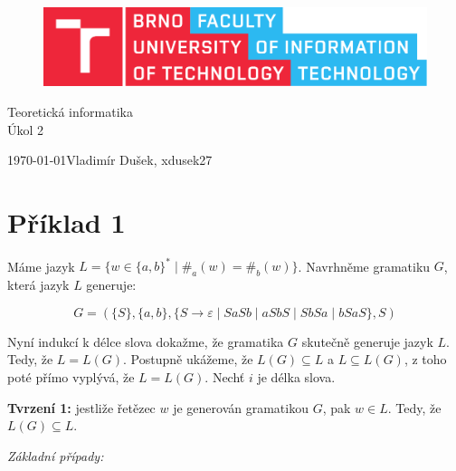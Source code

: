\documentclass[11pt, a4paper, titlepage]{article}
\begin{document}
\begin{titlepage}
    \begin{center}
        \begin{figure}[htb]
            \centering
            \includegraphics[width=0.85\hsize]{images/fitlogo.pdf}
        \end{figure}
        {\Huge Teoretická informatika} \\
        \bigskip
        {\LARGE Úkol 2} \\
    \end{center}
    {\Large \today \hfill Vladimír Dušek, xdusek27}
\end{titlepage}






\section*{Příklad 1}

Máme jazyk $L = \{ w \in \{ a, b \}^* \mid \#_a(w) = \#_b(w) \}$. Navrhněme gramatiku $G$, která jazyk $L$ generuje:

$$
    G = (
        \{S\},
        \{a, b\},
        \{S \rightarrow \varepsilon \mid SaSb \mid aSbS \mid SbSa \mid bSaS\},
        S
    )
$$

Nyní indukcí k délce slova dokažme, že gramatika $G$ skutečně generuje jazyk $L$. Tedy, že $L = L(G)$. Postupně ukážeme, že $L(G) \subseteq L$ a $L \subseteq L(G)$, z toho poté přímo vyplývá, že $L = L(G)$. Nechť $i$ je délka slova.
\bigskip
\bigskip



\textbf{Tvrzení 1:} jestliže řetězec $w$ je generován gramatikou $G$, pak $w \in L$. Tedy, že $L(G) \subseteq L$.
\bigskip

\textit{Základní případy:}
\end{document}
